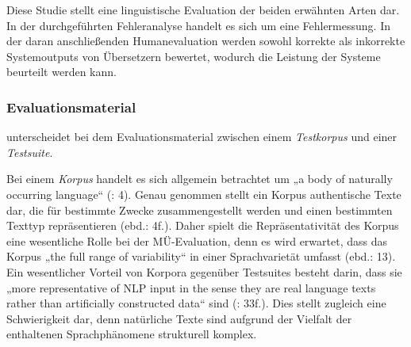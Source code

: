 Diese Studie stellt eine linguistische Evaluation der beiden erwähnten Arten dar. In der durchgeführten Fehleranalyse handelt es sich um eine Fehlermessung. In der daran anschließenden Humanevaluation werden sowohl korrekte als inkorrekte Systemoutputs von Übersetzern bewertet, wodurch die Leistung der Systeme beurteilt werden kann.

\subsubsection{Evaluationsmaterial}


\citet[64f.]{Weber1998} unterscheidet bei dem Evaluationsmaterial zwischen einem \textit{Testkorpus} und einer \textit{Testsuite}.

Bei einem \textit{Korpus} handelt es sich allgemein betrachtet um „a body of naturally occurring language“ (\citealt{McEneryEtAl2006}: 4). Genau genommen stellt ein Korpus authentische Texte dar, die für bestimmte Zwecke zusammengestellt werden und einen bestimmten Texttyp repräsentieren (ebd.: 4f.). Daher spielt die Repräsentativität des Korpus eine wesentliche Rolle bei der MÜ-Evaluation, denn es wird erwartet, dass das Korpus „the full range of variability“ in einer Sprachvarietät umfasst (ebd.: 13). Ein wesentlicher Vorteil von Korpora gegenüber Testsuites besteht darin, dass sie „more representative of NLP input in the sense they are real language texts rather than artificially constructed data“ sind (\citealt{BalkanEtAl1994}: 33f.). Dies stellt zugleich eine Schwierigkeit dar, denn natürliche Texte sind aufgrund der Vielfalt der enthaltenen Sprachphänomene strukturell komplex.

